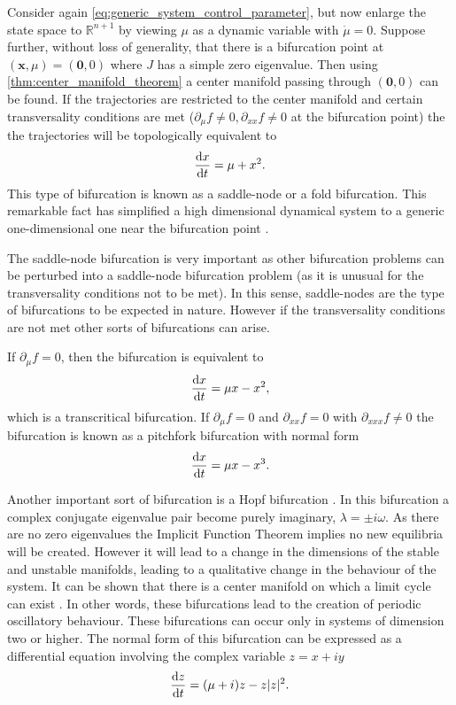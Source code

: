 Consider again \cref{eq:generic_system_control_parameter}, but now enlarge the state space to $\mathbb{R}^{n+1}$ by viewing $\mu$ as a dynamic variable with $\dot{\mu} = 0$. Suppose
further, without loss of generality, that there is a bifurcation point at $(\bm{x},\mu)  = (\bm{0},0)$ where $J$ has a simple zero eigenvalue.
Then using \cref{thm:center_manifold_theorem} a center manifold passing through
$(\bm{0},0)$ can be found. If the trajectories are restricted to the center manifold and certain transversality conditions are met ($\partial_{\mu}f \neq 0,\partial_{xx} f\neq 0$ at the
bifurcation point) the the trajectories will be topologically equivalent \parencite{guckenheimer2013} to
\begin{equation}
  \label{eq:saddle_node}
  \dv{x}{t}  = \mu + x^2.
\end{equation}
This type of bifurcation is known as a saddle-node or a fold bifurcation.
This remarkable fact has simplified a high dimensional dynamical system to a generic one-dimensional one near the bifurcation point \parencite{Glendinning1994}.

The saddle-node bifurcation is very important as other bifurcation problems can be perturbed into a saddle-node bifurcation problem (as it is unusual for the transversality conditions
not to be met). In this sense, saddle-nodes are the type of bifurcations to be expected in nature. However if the transversality conditions are not met other sorts of bifurcations can arise.

If $\partial_{\mu}f=0$, then the bifurcation is equivalent to
\begin{equation}
  \label{eq:transcritical}
  \dv{x}{t} = \mu x - x^2,
\end{equation}
which is a transcritical bifurcation. If $\partial_{\mu}f = 0$ and $\partial_{xx}f=0$ with $\partial_{xxx}f \neq 0$ the bifurcation is known as a pitchfork bifurcation with normal form
\begin{equation}
  \label{eq:pitchfork}
  \dv{x}{t} = \mu x - x^3.
\end{equation}

Another important sort of bifurcation is a Hopf bifurcation \parencite{Hopf1942}. In this bifurcation a complex conjugate eigenvalue pair become purely imaginary, $\lambda = \pm i\omega$.
As there are no zero eigenvalues the Implicit Function Theorem implies no new equilibria will be created. However it will lead to a change in the dimensions of the
stable and unstable manifolds, leading to a qualitative change in the behaviour of the system. It can be shown that there is a center manifold on which a limit cycle can exist
\parencite{guckenheimer2013}. In other words, these bifurcations lead to the creation of periodic oscillatory behaviour. These bifurcations
can occur only in systems of dimension two or higher. The normal form of this bifurcation \parencite{Kuznetsov2004} can be expressed as a differential equation involving the complex variable $z = x + iy$
\begin{equation}
  \label{eq:hopf}
  \dv{z}{t} = (\mu + i) z - z|z|^2.
\end{equation}

